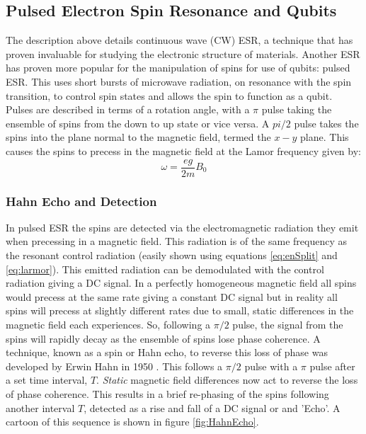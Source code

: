 \subsection{Pulsed Electron Spin Resonance and Qubits}
The description above details continuous wave (CW) ESR, a technique that has proven invaluable for studying the electronic structure of materials.
Another ESR has proven more popular for the manipulation of spins for use of qubits: pulsed ESR.
This uses short bursts of microwave radiation, on resonance with the spin transition, to control spin states and allows the spin to function as a qubit.
Pulses are described in terms of a rotation angle, with a $\pi$ pulse taking  the ensemble of spins from the down to up state or vice versa. 
A $pi/2$ pulse takes the spins into the plane normal to the magnetic field, termed the $x-y$ plane. 
This causes the spins to precess in the magnetic field at the Lamor frequency given by:
\begin{equation}
\label{eq:larmor}
\omega = \frac{eg}{2m}B_0
\end{equation}

\subsubsection{Hahn Echo and Detection}

In pulsed ESR the spins are detected via the electromagnetic radiation they emit when precessing in a magnetic field. 
This radiation is of the same frequency as the resonant control radiation (easily shown using equations \ref{eq:enSplit} and \ref{eq:larmor}).
This emitted radiation can be demodulated with the control radiation giving a DC signal.
In a perfectly homogeneous magnetic field all spins would precess at the same rate giving a constant DC signal but in reality all spins will precess at slightly different rates due to small, static differences in the magnetic field each experiences.
So, following a $\pi/2$ pulse, the signal from the spins will rapidly decay as the ensemble of spins lose phase coherence. 
A technique, known as a spin or Hahn echo, to reverse this loss of phase was developed by Erwin Hahn in 1950 \cite{hahn1950}. 
This follows a $\pi/2$ pulse with a $\pi$ pulse after a set time interval, $T$. 
\textit{Static} magnetic field differences now act to reverse the loss of phase coherence. 
This results in a brief re-phasing of the spins following another interval $T$, detected as a rise and fall of a DC signal or and 'Echo'.
A cartoon of this sequence is shown in figure \ref{fig:HahnEcho}. 

